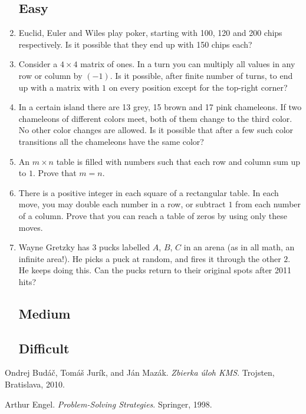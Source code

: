 \documentclass[11pt,a5paper]{article}
\begin{document}
\begin{enumerate}
	\subsection*{Easy}
	\item{Euclid, Euler and Wiles play poker, starting with 100, 120 and 200 chips respectively. Is it possible that they end up with 150 chips each?}
	
	\item{Consider a $4\times 4$ matrix of ones. In a turn you can  multiply all values in any row or column by $(-1)$. Is it possible, after finite number of turns, to end up with a matrix with $1$ on every position except for the top-right corner?}
		
	\item{In a certain island there are 13 grey, 15 brown and 17 pink chameleons. If two chameleons of different colors meet, both of them change to the third color. No other color changes are allowed. Is it possible that after a few such color transitions all the chameleons have the same color?}
	
	\item{An $m\times n$ table is filled with numbers such that each row and column sum up to $1$. Prove
that $m = n$.}
	
	\item{There is a positive integer in each square of a rectangular table. In each move, you may double
each number in a row, or subtract $1$ from each number of a column. Prove that you can reach a table of zeros by using only these moves.}
	
	\item{Wayne Gretzky has 3 pucks labelled $A$, $B$, $C$ in an arena (as in all math, an infinite area!). He picks a puck at random, and fires it through the other $2$. He keeps doing this. Can the pucks return to their original spots after 2011 hits?}
	\subsection*{Medium}

	\subsection*{Difficult}
	
	
\end{enumerate}

\begin{thebibliography}{9}
 Ondrej Budáč, Tomáš Jurík, and Ján Mazák. \emph{Zbierka úloh KMS}. Trojsten, Bratislava, 2010.

Arthur Engel. \emph{Problem-Solving Strategies}. Springer, 1998.

\end{thebibliography}
\end{document}
